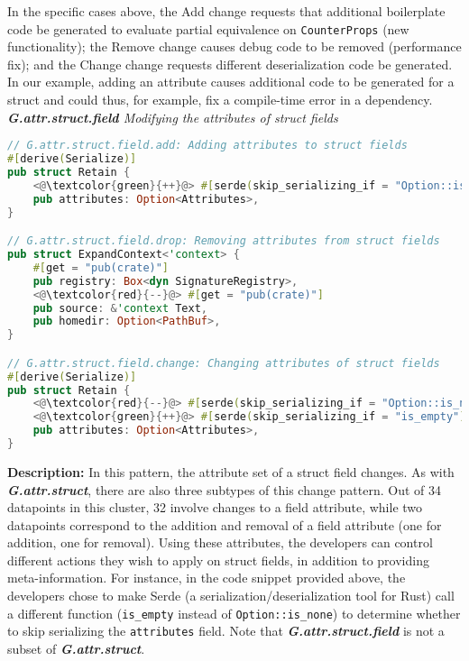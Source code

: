 In the specific cases above, the Add change requests that additional boilerplate code be generated to evaluate partial equivalence on \texttt{CounterProps} (new functionality); the Remove change causes debug code to be removed (performance fix); and the Change change requests different deserialization code be generated. In our example, adding an attribute causes additional code to be generated for a struct and could thus, for example, fix a compile-time error in a dependency. \\

\noindent\textit{\textbf{G.attr.struct.field} Modifying the attributes of struct fields}

\begin{lstlisting}[language=Rust, style=colouredRust]
// G.attr.struct.field.add: Adding attributes to struct fields
#[derive(Serialize)]
pub struct Retain {
    <@\textcolor{green}{++}@> #[serde(skip_serializing_if = "Option::is_none")]
    pub attributes: Option<Attributes>,
}

// G.attr.struct.field.drop: Removing attributes from struct fields
pub struct ExpandContext<'context> {
    #[get = "pub(crate)"]
    pub registry: Box<dyn SignatureRegistry>,
    <@\textcolor{red}{--}@> #[get = "pub(crate)"]
    pub source: &'context Text,
    pub homedir: Option<PathBuf>,
}

// G.attr.struct.field.change: Changing attributes of struct fields
#[derive(Serialize)]
pub struct Retain {
    <@\textcolor{red}{--}@> #[serde(skip_serializing_if = "Option::is_none")]
    <@\textcolor{green}{++}@> #[serde(skip_serializing_if = "is_empty")]
    pub attributes: Option<Attributes>,
}
\end{lstlisting}

\noindent\textbf{Description:} In this pattern, the attribute set of a struct field changes. As with \textit{\textbf{G.attr.struct}}, there are also three subtypes of this change pattern. Out of 34 datapoints in this cluster, 32 involve changes to a field attribute, while two datapoints correspond to the addition and removal of a field attribute (one for addition, one for removal). Using these attributes, the developers can control different actions they wish to apply on struct fields, in addition to providing meta-information. For instance, in the code snippet provided above, the developers chose to make Serde (a serialization/deserialization tool for Rust) call a different function (\verb+is_empty+ instead of \verb+Option::is_none+) to determine whether to skip serializing the \verb+attributes+ field. Note that \textit{\textbf{G.attr.struct.field}} is not a subset of \textit{\textbf{G.attr.struct}}. \\

